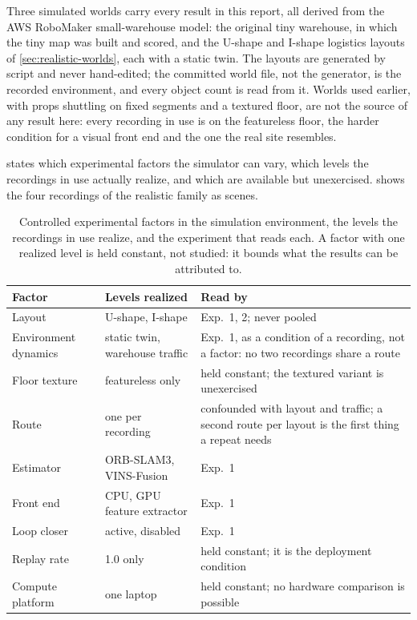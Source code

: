 Three simulated worlds carry every result in this report, all derived from the
AWS RoboMaker small-warehouse model: the original tiny warehouse, in which the
tiny map was built and scored, and the U-shape and I-shape logistics layouts of
\cref{sec:realistic-worlds}, each with a static twin. The layouts are generated
by script and never hand-edited; the committed world file, not the generator,
is the recorded environment, and every object count is read from it. Worlds
used earlier, with props shuttling on fixed segments and a textured floor, are
not the source of any result here: every recording in use is on the featureless
floor, the harder condition for a visual front end and the one the real site
resembles.

 states which experimental factors the simulator
can vary, which levels the recordings in use actually realize, and which are
available but unexercised.  shows the four
recordings of the realistic family as scenes.

\begin{table}[htbp]
\centering
\caption[Controlled experimental factors and the levels realized.]{Controlled
experimental factors in the simulation environment, the levels the recordings
in use realize, and the experiment that reads each. A factor with one realized
level is held constant, not studied: it bounds what the results can be
attributed to.}
\label{tab:controlled-factors}
\small
\begin{tabularx}{\textwidth}{>{\raggedright\arraybackslash}p{}>{\raggedright\arraybackslash}p{}>{\raggedright\arraybackslash}X}
\toprule
Factor & Levels realized & Read by \\
\midrule
Layout & U-shape, I-shape & Exp.\ 1, 2; never pooled \\
Environment dynamics & static twin, warehouse traffic & Exp.\ 1, as a
  condition of a recording, not a factor: no two recordings share a route \\
Floor texture & featureless only & held constant; the textured variant is
  unexercised \\
Route & one per recording & confounded with layout and traffic; a second
  route per layout is the first thing a repeat needs \\
Estimator & ORB-SLAM3, VINS-Fusion & Exp.\ 1 \\
Front end & CPU, GPU feature extractor & Exp.\ 1 \\
Loop closer & active, disabled & Exp.\ 1 \\
Replay rate & \num{1.0} only & held constant; it is the deployment condition \\
Compute platform & one laptop & held constant; no hardware comparison is
  possible \\
\bottomrule
\end{tabularx}
\end{table}

